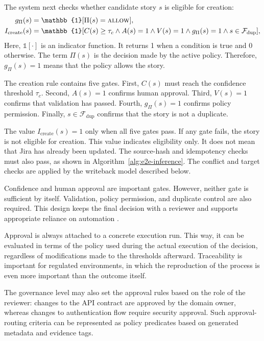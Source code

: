 \documentclass[manuscript,review]{acmart}
\begin{document}
The system next checks whether candidate story $s$ is eligible for creation:
\begin{equation}
\begin{aligned}
g_{\Pi}(s) ={}& \mathbb{1}[\Pi(s)=\textsc{allow}],\\
I_{\mathrm{create}}(s) ={}&
\mathbb{1}[C(s)\ge\tau_c \land A(s)=1 \land V(s)=1 \land g_{\Pi}(s)=1 \land s\in\mathcal{F}_{\mathrm{dup}}],
\end{aligned}
\end{equation}
Here, $\mathbb{1}[\cdot]$ is an indicator function. It returns 1 when a condition is true and 0 otherwise. The term $\Pi(s)$ is the decision made by the active policy. Therefore, $g_{\Pi}(s)=1$ means that the policy allows the story.

The creation rule contains five gates. First, $C(s)$ must reach the confidence threshold $\tau_c$. Second, $A(s)=1$ confirms human approval. Third, $V(s)=1$ confirms that validation has passed. Fourth, $g_{\Pi}(s)=1$ confirms policy permission. Finally, $s\in\mathcal{F}_{\mathrm{dup}}$ confirms that the story is not a duplicate.

The value $I_{\mathrm{create}}(s)=1$ only when all five gates pass. If any gate fails, the story is not eligible for creation. This value indicates eligibility only. It does not mean that Jira has already been updated. The source-hash and idempotency checks must also pass, as shown in Algorithm~\ref{alg:e2e-inference}. The conflict and target checks are applied by the writeback model described below.

Confidence and human approval are important gates. However, neither gate is sufficient by itself. Validation, policy permission, and duplicate control are also required. This design keeps the final decision with a reviewer and supports appropriate reliance on automation \cite{R56,R75}.

Approval is always attached to a concrete execution run. This way, it can be evaluated in terms of the policy used during the actual execution of the decision, regardless of modifications made to the thresholds afterward. Traceability is important for regulated environments, in which the reproduction of the process is even more important than the outcome itself.

The governance level may also set the approval rules based on the role of the reviewer: changes to the API contract are approved by the domain owner, whereas changes to authentication flow require security approval. Such approval-routing criteria can be represented as policy predicates based on generated metadata and evidence tags.
\end{document}
